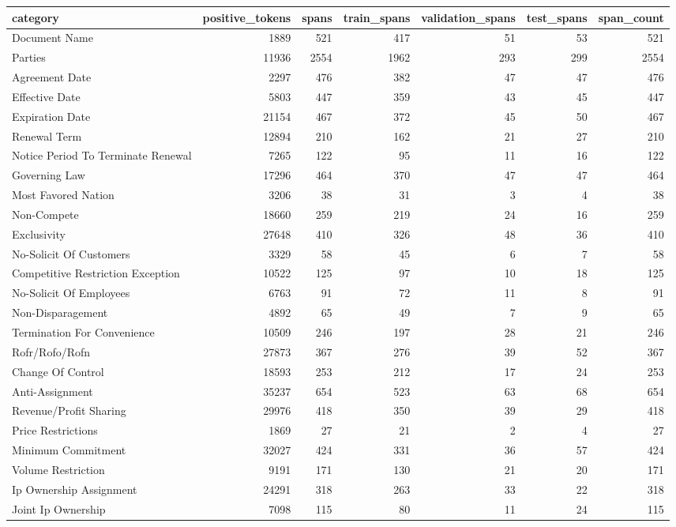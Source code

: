 \begin{tabular}{lrrrrrr}
\toprule
category & positive\_tokens & spans & train\_spans & validation\_spans & test\_spans & span\_count \\
\midrule
Document Name & 1889 & 521 & 417 & 51 & 53 & 521 \\
Parties & 11936 & 2554 & 1962 & 293 & 299 & 2554 \\
Agreement Date & 2297 & 476 & 382 & 47 & 47 & 476 \\
Effective Date & 5803 & 447 & 359 & 43 & 45 & 447 \\
Expiration Date & 21154 & 467 & 372 & 45 & 50 & 467 \\
Renewal Term & 12894 & 210 & 162 & 21 & 27 & 210 \\
Notice Period To Terminate Renewal & 7265 & 122 & 95 & 11 & 16 & 122 \\
Governing Law & 17296 & 464 & 370 & 47 & 47 & 464 \\
Most Favored Nation & 3206 & 38 & 31 & 3 & 4 & 38 \\
Non-Compete & 18660 & 259 & 219 & 24 & 16 & 259 \\
Exclusivity & 27648 & 410 & 326 & 48 & 36 & 410 \\
No-Solicit Of Customers & 3329 & 58 & 45 & 6 & 7 & 58 \\
Competitive Restriction Exception & 10522 & 125 & 97 & 10 & 18 & 125 \\
No-Solicit Of Employees & 6763 & 91 & 72 & 11 & 8 & 91 \\
Non-Disparagement & 4892 & 65 & 49 & 7 & 9 & 65 \\
Termination For Convenience & 10509 & 246 & 197 & 28 & 21 & 246 \\
Rofr/Rofo/Rofn & 27873 & 367 & 276 & 39 & 52 & 367 \\
Change Of Control & 18593 & 253 & 212 & 17 & 24 & 253 \\
Anti-Assignment & 35237 & 654 & 523 & 63 & 68 & 654 \\
Revenue/Profit Sharing & 29976 & 418 & 350 & 39 & 29 & 418 \\
Price Restrictions & 1869 & 27 & 21 & 2 & 4 & 27 \\
Minimum Commitment & 32027 & 424 & 331 & 36 & 57 & 424 \\
Volume Restriction & 9191 & 171 & 130 & 21 & 20 & 171 \\
Ip Ownership Assignment & 24291 & 318 & 263 & 33 & 22 & 318 \\
Joint Ip Ownership & 7098 & 115 & 80 & 11 & 24 & 115 \\

\end{tabular}
